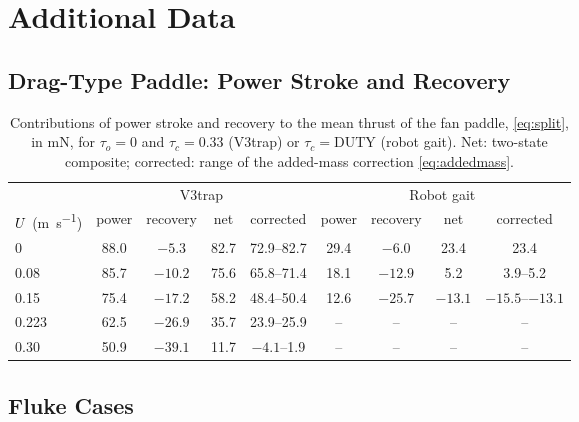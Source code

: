 \chapter{Additional Data}
\label{app:data}

\section{Drag-Type Paddle: Power Stroke and Recovery}
\label{app:drag-split}

\begin{table}[H]
  \centering
  \caption[Power-stroke and recovery contributions]{Contributions of power stroke and recovery to the mean thrust of the fan
    paddle, \eqref{eq:split}, in \si{\milli\newton}, for $\tau_o=0$ and $\tau_c=0.33$ (V3trap) or $\tau_c=\mathrm{DUTY}$ (robot gait).
    Net: two-state composite; corrected: range of the added-mass correction \eqref{eq:addedmass}.}
  \label{tab:app-split}
  \footnotesize
  \begin{tabular}{@{}lcccc|cccc@{}}
    \toprule
    & \multicolumn{4}{c|}{V3trap} & \multicolumn{4}{c}{Robot gait} \\
    $U$ (\si{\metre\per\second}) & power & recovery & net & corrected & power & recovery & net & corrected \\
    \midrule
    0     & 88.0 & $-5.3$  & 82.7 & 72.9--82.7 & 29.4 & $-6.0$  & 23.4    & 23.4 \\
    0.08  & 85.7 & $-10.2$ & 75.6 & 65.8--71.4 & 18.1 & $-12.9$ & 5.2     & 3.9--5.2 \\
    0.15  & 75.4 & $-17.2$ & 58.2 & 48.4--50.4 & 12.6 & $-25.7$ & $-13.1$ & $-15.5$--$-13.1$ \\
    0.223 & 62.5 & $-26.9$ & 35.7 & 23.9--25.9 & --   & --      & --      & -- \\
    0.30  & 50.9 & $-39.1$ & 11.7 & $-4.1$--1.9 & --  & --      & --      & -- \\
    \bottomrule
  \end{tabular}
\end{table}

\section{Fluke Cases}
\label{app:fluke}

